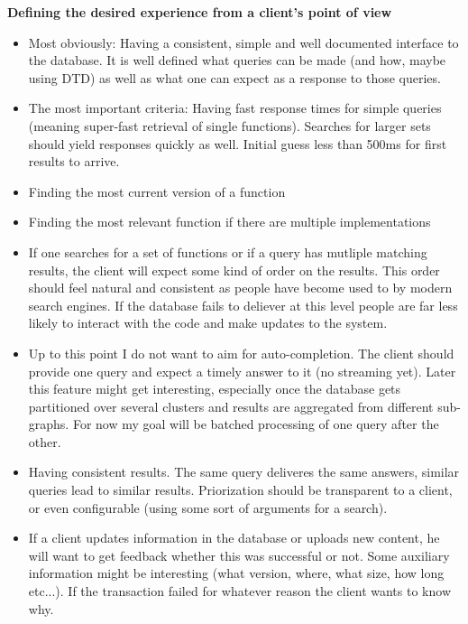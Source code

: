 \documentclass[twoside, 11pt]{scrartcl}
\begin{document}
\textbf{Defining the desired experience from a client's point of view}
\begin{itemize}
	\item Most obviously: Having a consistent, simple and well documented interface to the database. It is well defined what queries can be made (and how, maybe using DTD) as well as what one can expect as a response to those queries.
	\item The most important criteria: Having fast response times for simple queries (meaning super-fast retrieval of single functions). Searches for larger sets should yield responses quickly as well. Initial guess less than 500ms for first results to arrive.
	\item Finding the most current version of a function
	\item Finding the most relevant function if there are multiple implementations
	\item If one searches for a set of functions or if a query has mutliple matching results, the client will expect some kind of order on the results. This order should feel natural and consistent as people have become used to by modern search engines. If the database fails to deliever at this level people are far less likely to interact with the code and make updates to the system. 
	\item Up to this point I do not want to aim for auto-completion. The client should provide one query and expect a timely answer to it (no streaming yet). Later this feature might get interesting, especially once the database gets partitioned over several clusters and results are aggregated from different sub-graphs. For now my goal will be batched processing of one query after the other.
	\item Having consistent results. The same query deliveres the same answers, similar queries lead to similar results. Priorization should be transparent to a client, or even configurable (using some sort of arguments for a search).
	\item If a client updates information in the database or uploads new content, he will want to get feedback whether this was successful or not. Some auxiliary information might be interesting (what version, where, what size, how long etc...). If the transaction failed for whatever reason the client wants to know why.
\end{itemize}
\end{document}
